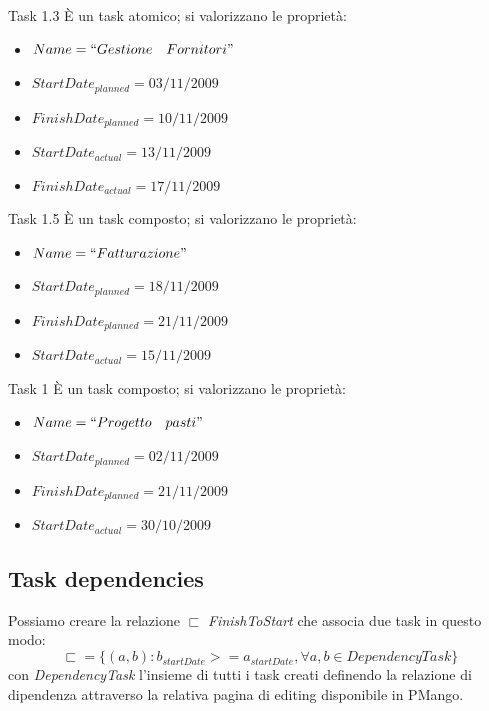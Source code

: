 \begin{taksDef}{Task 1.3} \`E un task atomico; si valorizzano le propriet\`a:
\begin{itemize}
  \item $Name = ``Gestione\quad Fornitori"$
  \item $StartDate_{planned} = 03/11/2009$
  \item $FinishDate_{planned} = 10/11/2009$
  \item $StartDate_{actual} = 13/11/2009$
  \item $FinishDate_{actual} = 17/11/2009$
\end{itemize}
\end{taksDef}

\begin{taksDef}{Task 1.5} \`E un task composto; si valorizzano le
propriet\`a:
\begin{itemize}
  \item $Name = ``Fatturazione"$
  \item $StartDate_{planned} = 18/11/2009$
  \item $FinishDate_{planned} = 21/11/2009$
  \item $StartDate_{actual} = 15/11/2009$
\end{itemize}
\end{taksDef}

\begin{taksDef}{Task 1} \`E un task composto; si valorizzano le propriet\`a:
\begin{itemize}
  \item $Name = ``Progetto\quad pasti"$
  \item $StartDate_{planned} = 02/11/2009$
  \item $FinishDate_{planned} = 21/11/2009$
  \item $StartDate_{actual} = 30/10/2009$
\end{itemize}
\end{taksDef}

\subsection{Task dependencies}
Possiamo creare la relazione $\sqsubset$ \emph{FinishToStart} che associa due
task in questo modo:
\begin{displaymath}
\sqsubset = \lbrace (a,b) : b_{startDate} >= a_{startDate}, \forall a,b \in
DependencyTask
\rbrace
\end{displaymath}
con \emph{DependencyTask} l'insieme di tutti i task creati definendo la
relazione di dipendenza attraverso la relativa pagina di editing disponibile in
PMango. 

